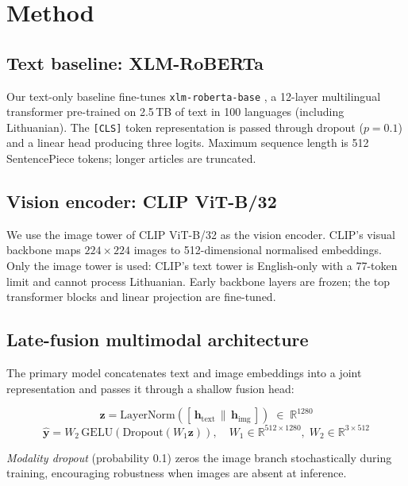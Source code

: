 \documentclass[12pt,a4paper]{article}
\begin{document}
\section{Method}
\label{sec:method}

\subsection{Text baseline: XLM-RoBERTa}

Our text-only baseline fine-tunes \texttt{xlm-roberta-base}
\parencite{conneau2020xlmr}, a 12-layer multilingual transformer pre-trained
on 2.5\,TB of text in 100 languages (including Lithuanian).
The \texttt{[CLS]} token representation is passed through dropout ($p{=}0.1$)
and a linear head producing three logits.
Maximum sequence length is 512 SentencePiece tokens; longer articles are
truncated.

\subsection{Vision encoder: CLIP ViT-B/32}
\label{sec:vision}

We use the image tower of CLIP ViT-B/32 \parencite{radford2021clip}
as the vision encoder.
CLIP's visual backbone maps $224{\times}224$ images to 512-dimensional
normalised embeddings.
Only the image tower is used: CLIP's text tower is English-only with a
77-token limit and cannot process Lithuanian.
Early backbone layers are frozen; the top transformer blocks and linear
projection are fine-tuned.

\subsection{Late-fusion multimodal architecture}
\label{sec:arch}

The primary model concatenates text and image embeddings into a joint
representation and passes it through a shallow fusion head:

\[
\mathbf{z} = \mathrm{LayerNorm}([\,\mathbf{h}_\text{text} \,\|\, \mathbf{h}_\text{img}\,])
   \;\in\; \mathbb{R}^{1280}
\]
\[
\hat{\mathbf{y}} = W_2\,\mathrm{GELU}\!\left(\mathrm{Dropout}(W_1 \mathbf{z})\right),
   \quad W_1 \in \mathbb{R}^{512\times1280},\; W_2 \in \mathbb{R}^{3\times512}
\]

\emph{Modality dropout} (probability 0.1) zeros the image branch stochastically
during training, encouraging robustness when images are absent at inference.
\end{document}
